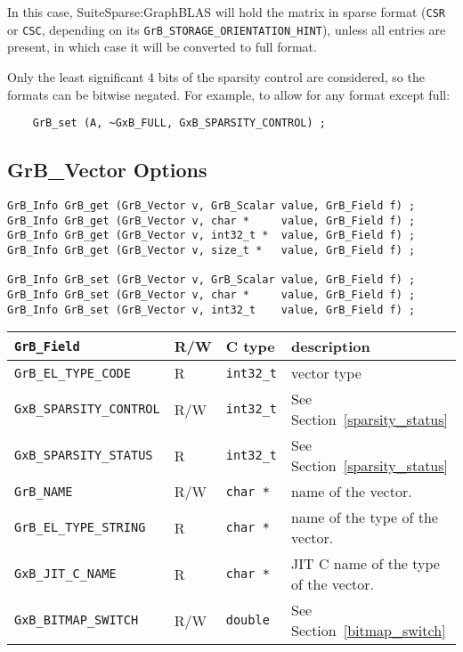 In this case, SuiteSparse:GraphBLAS will hold the matrix in sparse format
(\verb'CSR' or \verb'CSC', depending on its
\verb'GrB_STORAGE_ORIENTATION_HINT'), unless all entries are present, in which
case it will be converted to full format.

Only the least significant 4 bits of the sparsity control are considered, so
the formats can be bitwise negated.  For example, to allow for any format
except full:

{\footnotesize
\begin{verbatim}
    GrB_set (A, ~GxB_FULL, GxB_SPARSITY_CONTROL) ; \end{verbatim}}

\newpage
\subsection{{\sf GrB\_Vector} Options}
\label{get_set_vector}

\begin{mdframed}[userdefinedwidth=6in]
{\footnotesize
\begin{verbatim}
GrB_Info GrB_get (GrB_Vector v, GrB_Scalar value, GrB_Field f) ;
GrB_Info GrB_get (GrB_Vector v, char *     value, GrB_Field f) ;
GrB_Info GrB_get (GrB_Vector v, int32_t *  value, GrB_Field f) ;
GrB_Info GrB_get (GrB_Vector v, size_t *   value, GrB_Field f) ;

GrB_Info GrB_set (GrB_Vector v, GrB_Scalar value, GrB_Field f) ;
GrB_Info GrB_set (GrB_Vector v, char *     value, GrB_Field f) ;
GrB_Info GrB_set (GrB_Vector v, int32_t    value, GrB_Field f) ;
\end{verbatim}
}\end{mdframed}

\noindent
{\small
\begin{tabular}{|l|l|l|p{3in}|}
\hline
\verb'GrB_Field'                    & R/W  & C type        & description \\
\hline
\verb'GrB_EL_TYPE_CODE'             & R    & \verb'int32_t'& vector type \\
\verb'GxB_SPARSITY_CONTROL'         & R/W  & \verb'int32_t'& See Section~\ref{sparsity_status} \\
\verb'GxB_SPARSITY_STATUS'          & R    & \verb'int32_t'& See Section~\ref{sparsity_status} \\
\hline
\verb'GrB_NAME'                     & R/W  & \verb'char *' & name of the vector. \\
\verb'GrB_EL_TYPE_STRING'           & R    & \verb'char *' & name of the type of the vector. \\
\verb'GxB_JIT_C_NAME'               & R    & \verb'char *' & JIT C name of the type of the vector. \\
\hline
\verb'GxB_BITMAP_SWITCH'            & R/W  & \verb'double' & See Section~\ref{bitmap_switch} \\
\hline
\end{tabular}
}

